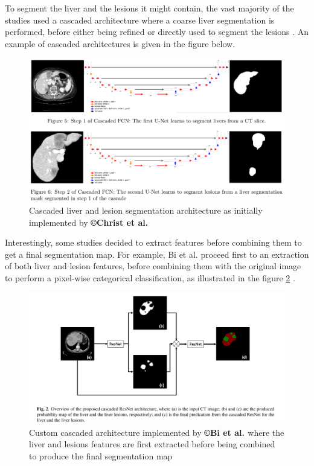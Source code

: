 To segment the liver and the lesions it might contain, the vast majority
of the studies used a cascaded architecture where a coarse liver
segmentation is performed, before either being refined \cite{Yuan2017} or directly used to segment the lesions \cite{Han2017, Li2018, Kaluva2018, Ben-Cohen, Christ2017}. An example of cascaded architectures is
given in the figure below. 
\begin{figure}[th!]
	\centering
	\includegraphics[width=\linewidth]{images/image35}
	\caption{Cascaded liver and lesion segmentation architecture as initially implemented by \textbf{©Christ et al. \cite{Christ2017}}}
	\label{Cascade_Christ}
\end{figure}

Interestingly, some studies decided to extract features before combining
them to get a final segmentation map. For example, Bi et al.
proceed first to an extraction of both liver and lesion features, before
combining them with the original image to perform a pixel-wise
categorical classification, as illustrated in the figure \ref{Bi2017_Fig2} \cite{Bi2017}.

\begin{figure}[th!]
	\centering
	\includegraphics[width=0.7\linewidth]{images/image27}
	\caption{Custom cascaded architecture implemented by \textbf{©Bi et al. \cite{Bi2017}} where the liver and lesions features are first extracted before being combined to produce the final segmentation map }
	\label{Bi2017_Fig2}
\end{figure}


